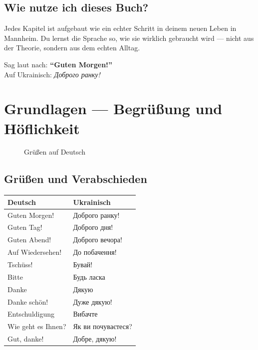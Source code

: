 \documentclass[12pt,twoside,openright]{memoir}
\begin{document}
\section{Wie nutze ich dieses Buch?}

Jedes Kapitel ist aufgebaut wie ein echter Schritt in deinem neuen Leben in Mannheim. Du lernst die Sprache so, wie sie wirklich gebraucht wird — nicht aus der Theorie, sondern aus dem echten Alltag.

\vspace{1em}
\begin{uebungskasten}
  Sag laut nach: \textbf{``Guten Morgen!''} \\
  Auf Ukrainisch: \textit{Доброго ранку!}
\end{uebungskasten}

\chapter{Grundlagen — Begrüßung und Höflichkeit}

\begin{figure}[h]
  \centering
  \fbox{\rule{0pt}{3cm}\rule{8cm}{0pt}} %
  \caption{Grüßen auf Deutsch}
\end{figure}

\section{Grüßen und Verabschieden}

\begin{lernkasten}
\begin{tabular}{p{5cm} p{5cm}}
\toprule
\textbf{Deutsch} & \textbf{Ukrainisch} \\
\midrule
Guten Morgen! & Доброго ранку! \\
Guten Tag! & Доброго дня! \\
Guten Abend! & Доброго вечора! \\
Auf Wiedersehen! & До побачення! \\
Tschüss! & Бувай! \\
Bitte & Будь ласка \\
Danke & Дякую \\
Danke schön! & Дуже дякую! \\
Entschuldigung & Вибачте \\
Wie geht es Ihnen? & Як ви почуваєтеся? \\
Gut, danke! & Добре, дякую! \\
\bottomrule
\end{tabular}
\end{lernkasten}
\end{document}
